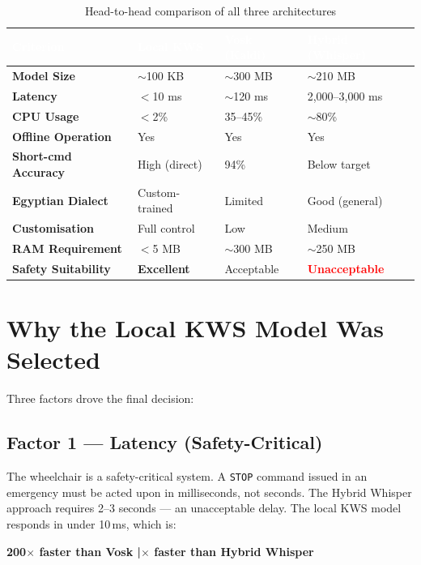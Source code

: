 \documentclass[12pt, a4paper]{report}
\newcommand{\thead}[1]{%
  \cellcolor{tableheader}\textcolor{white}{\textbf{#1}}}
\newcommand{\trow}[1]{\rowcolor{rowalt}#1}
\begin{document}
\begin{table}[h!]
\centering
\caption{Head-to-head comparison of all three architectures}
\label{tab:comparison}
\begin{tabularx}{\textwidth}{>{\bfseries}lXXX}
\toprule
\thead{Criterion} & \thead{Local KWS} & \thead{Vosk (Kaldi)} & \thead{Hybrid (Whisper)} \\
\midrule
\trow{Model Size}        & $\sim$100 KB   & $\sim$300 MB   & $\sim$210 MB \\
Latency                  & $<$10 ms       & $\sim$120 ms   & 2,000--3,000 ms \\
\trow{CPU Usage}         & $<$2\%         & 35--45\%       & $\sim$80\% \\
Offline Operation        & Yes            & Yes            & Yes \\
\trow{Short-cmd Accuracy}& High (direct)  & 94\%           & Below target \\
Egyptian Dialect         & Custom-trained & Limited        & Good (general) \\
\trow{Customisation}     & Full control   & Low            & Medium \\
RAM Requirement          & $<$5 MB        & $\sim$300 MB   & $\sim$250 MB \\
\trow{Safety Suitability}& \textbf{Excellent} & Acceptable & \textcolor{red}{\textbf{Unacceptable}} \\
\bottomrule
\end{tabularx}
\end{table}

\section{Why the Local KWS Model Was Selected}

Three factors drove the final decision:

\subsection{Factor 1 --- Latency (Safety-Critical)}

The wheelchair is a safety-critical system. A \texttt{STOP} command issued in an
emergency must be acted upon in milliseconds, not seconds. The Hybrid Whisper approach
requires 2--3 seconds --- an unacceptable delay. The local KWS model responds in under
10\,ms, which is:

\begin{center}
\textbf{200$\times$ faster than Vosk \quad|$\times$ faster than Hybrid Whisper}
\end{center}
\end{document}
